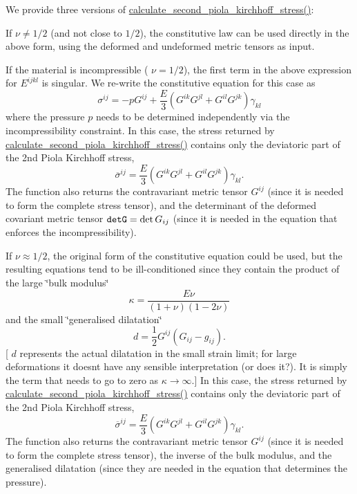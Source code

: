 We provide three versions of {\ttfamily \hyperlink{classoomph_1_1GeneralisedHookean_a5beca3e59f04d109c394bf9fd24bb7c1}{calculate\+\_\+second\+\_\+piola\+\_\+kirchhoff\+\_\+stress()}}\+:
\begin{DoxyEnumerate}
\item If $ \nu \ne 1/2 $ (and not close to $ 1/2 $), the constitutive law can be used directly in the above form, using the deformed and undeformed metric tensors as input.
\item If the material is incompressible ( $ \nu = 1/2 $), the first term in the above expression for $ E^{ijkl} $ is singular. We re-\/write the constitutive equation for this case as \[ \sigma^{ij} = -p G^{ij} + \frac{E}{3} \left( G^{ik} G^{jl} + G^{il} G^{jk} \right) \gamma_{kl} \] where the pressure $ p $ needs to be determined independently via the incompressibility constraint. In this case, the stress returned by {\ttfamily \hyperlink{classoomph_1_1GeneralisedHookean_a5beca3e59f04d109c394bf9fd24bb7c1}{calculate\+\_\+second\+\_\+piola\+\_\+kirchhoff\+\_\+stress()}} contains only the deviatoric part of the 2nd Piola Kirchhoff stress, \[ \overline{\sigma}^{ij} = \frac{E}{3} \left( G^{ik} G^{jl} + G^{il} G^{jk} \right) \gamma_{kl}. \] The function also returns the contravariant metric tensor $ G^{ij}$ (since it is needed to form the complete stress tensor), and the determinant of the deformed covariant metric tensor $ {\tt detG} = \det G_{ij} $ (since it is needed in the equation that enforces the incompressibility).
\item If $ \nu \approx 1/2 $, the original form of the constitutive equation could be used, but the resulting equations tend to be ill-\/conditioned since they contain the product of the large \char`\"{}bulk modulus\char`\"{} \[ \kappa = \frac{E\nu}{(1+\nu)(1-2\nu)} \] and the small \char`\"{}generalised dilatation\char`\"{} \[ d = \frac{1}{2} G^{ij} (G_{ij}-g_{ij}). \] \mbox{[} $ d $ represents the actual dilatation in the small strain limit; for large deformations it doesn\textquotesingle{}t have any sensible interpretation (or does it?). It is simply the term that needs to go to zero as $ \kappa \to \infty$.\mbox{]} In this case, the stress returned by {\ttfamily \hyperlink{classoomph_1_1GeneralisedHookean_a5beca3e59f04d109c394bf9fd24bb7c1}{calculate\+\_\+second\+\_\+piola\+\_\+kirchhoff\+\_\+stress()}} contains only the deviatoric part of the 2nd Piola Kirchhoff stress, \[ \overline{\sigma}^{ij} = \frac{E}{3} \left( G^{ik} G^{jl} + G^{il} G^{jk} \right) \gamma_{kl}. \] The function also returns the contravariant metric tensor $ G^{ij}$ (since it is needed to form the complete stress tensor), the inverse of the bulk modulus, and the generalised dilatation (since they are needed in the equation that determines the pressure). 
\end{DoxyEnumerate}

